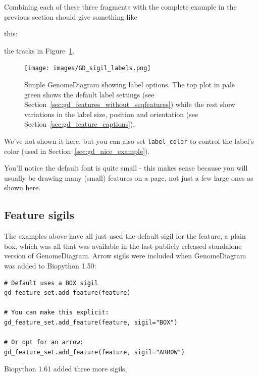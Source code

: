 \noindent Combining each of these three fragments with the complete example
in the previous section should give something like
\begin{htmlonly}
this:

\label{fig:gd_sigil_labels}

\end{htmlonly}
\begin{latexonly}
the tracks in Figure~\ref{fig:gd_sigil_labels}.
\begin{figure}[htbp]
\centering
\texttt{[image: images/GD\_sigil\_labels.png]}
\caption{Simple GenomeDiagram showing label options.
The top plot in pale green shows the default label settings (see
Section~\ref{sec:gd_features_without_seqfeatures}) while the rest show
variations in the label size, position and orientation (see
Section~\ref{sec:gd_feature_captions}).
}
\label{fig:gd_sigil_labels}
\end{figure}
\end{latexonly}

We've not shown it here, but you can also set \texttt{label\_color} to
control the label's color (used in Section~\ref{sec:gd_nice_example}).

You'll notice the default font is quite small - this makes sense because
you will usually be drawing many (small) features on a page, not just a
few large ones as shown here.

\subsection{Feature sigils}
\label{sec:gd_sigils}

The examples above have all just used the default sigil for the feature, a
plain box, which was all that was available in the last publicly released standalone version of GenomeDiagram. Arrow sigils were included when
GenomeDiagram was added to Biopython 1.50:

\begin{verbatim}
# Default uses a BOX sigil
gd_feature_set.add_feature(feature)

# You can make this explicit:
gd_feature_set.add_feature(feature, sigil="BOX")

# Or opt for an arrow:
gd_feature_set.add_feature(feature, sigil="ARROW")
\end{verbatim}

\noindent
Biopython 1.61 added three more sigils,

